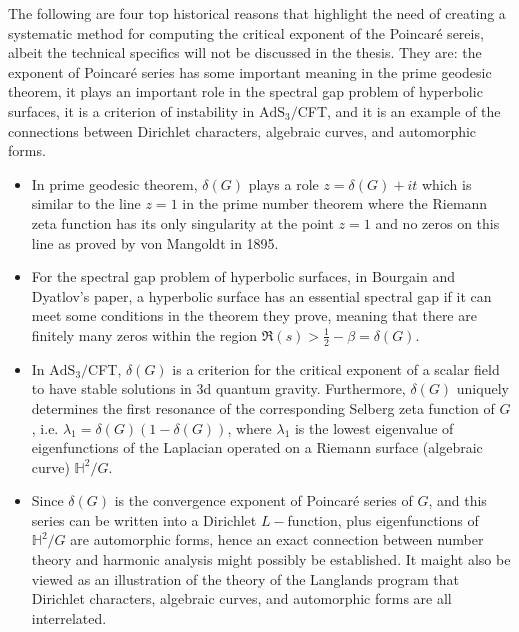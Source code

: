 \documentclass[12pt,oneside]{sfsuthesis}
\theoremstyle{plain} %
\theoremstyle{definition}  %
\theoremstyle{remark}  %
\theoremstyle{plain}
\begin{document}
{The following are four top historical reasons that highlight the need of creating a systematic method for computing the critical exponent of the Poincar\'{e} sereis, albeit the technical specifics will not be discussed in the thesis. They are: the exponent of Poincar\'{e} series has some important meaning in the prime geodesic theorem\cite{borthwick2007spectral}, it plays an important role in the spectral gap problem of hyperbolic surfaces\cite{bourgain2018spectral}, it is a criterion of instability in $\text{AdS}_3/$CFT\cite{dong2018phase}, and it is an example of the connections between Dirichlet characters, algebraic curves, and automorphic forms\cite{bump2003introduction,knapp1997introduction,knapp2009first,knapp2009prerequisites,mueller2021genesis}. 
\begin{itemize}
\item In prime geodesic theorem, $\delta(G)$ plays a role $z = \delta(G) + it$ which is similar to the line $z=1$ in the prime number theorem where the Riemann zeta function has its only singularity at the point $z = 1$ and no zeros on this line as proved by von Mangoldt in 1895.
\item For the spectral gap problem of hyperbolic surfaces, in Bourgain and Dyatlov's paper, a hyperbolic surface has an essential spectral gap if it can meet some conditions in the theorem they prove, meaning that there are finitely many zeros within the region $\Re(s)>\frac{1}{2}-\beta=\delta(G)$.
\item In $\text{AdS}_3/$CFT\cite{dong2018phase}, $\delta(G)$ is a criterion for the critical exponent of a scalar field to have stable solutions in 3d quantum gravity. Furthermore, $\delta(G)$ uniquely determines the first resonance of the corresponding Selberg zeta function of $G$, i.e. $\lambda_1=\delta(G)(1-\delta(G))$, where $\lambda_1$ is the lowest eigenvalue of eigenfunctions of the Laplacian operated on a Riemann surface (algebraic curve) $\mathbb{H}^2/G$.
\item Since $\delta(G)$ is the convergence exponent of Poincar\'{e} series of $G$, and this series can be written into a Dirichlet $L-$function, plus eigenfunctions of $\mathbb{H}^2/G$ are automorphic forms, hence an exact connection between number theory and harmonic analysis might possibly be established. It maight also be viewed as an illustration of the theory of the Langlands program that Dirichlet characters, algebraic curves, and automorphic forms are all interrelated.
\end{itemize}
 


}
\end{document}
